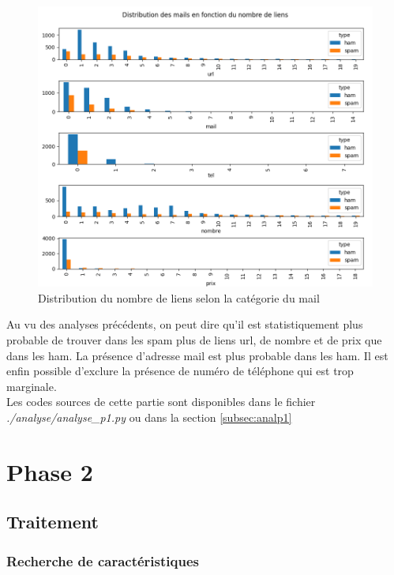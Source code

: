 \documentclass[a4paper,12pt]{article}
\begin{document}
			\begin{figure}[H]
				\includegraphics[width=\linewidth]{img/P1feat.png}
				\caption{Distribution du nombre de liens selon la catégorie du mail}
			\end{figure}
			
			
			Au vu des analyses précédents, on peut dire qu'il est statistiquement plus probable de trouver dans les spam plus de liens url, de nombre et de prix que dans les ham. La présence d'adresse mail est plus probable dans les ham. Il est enfin possible d'exclure la présence de numéro de téléphone qui est trop marginale.\\
			
			Les codes sources de cette partie sont disponibles dans le fichier \emph{./analyse/analyse\_p1.py} ou dans la section \ref{subsec:analp1}
			
			
			
 
	
\newpage
\section{Phase 2}
	\subsection{Traitement}
	
		\subsubsection{Recherche de caractéristiques}
\end{document}

